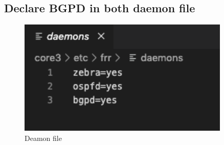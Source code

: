 \subsection{Declare BGPD in both daemon file}
\begin{figure}[H]
\centering
  \includegraphics[width=0.9\textwidth]{Images/Deamon.png}
  \caption{Deamon file }
  \label{fig }
\end{figure}
